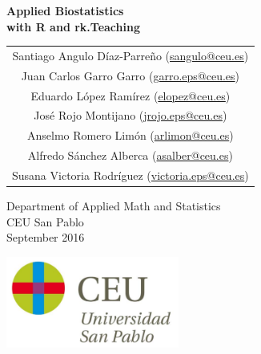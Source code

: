 \begin{titlepage}
\thispagestyle{empty}
\vspace*{7cm}
\par

\begin{center}
\normalfont\fontsize{30}{30}\selectfont
{\bfseries \color{blueceu}Applied Biostatistics\\ with R and rk.Teaching}
\end{center}
\vspace{1cm}

\begin{center}
\Large
\begin{tabular}{c}
Santiago Angulo Díaz-Parreño (\url{sangulo@ceu.es})\\
Juan Carlos Garro Garro (\url{garro.eps@ceu.es})\\
Eduardo López Ramírez (\url{elopez@ceu.es})\\
José Rojo Montijano (\url{jrojo.eps@ceu.es})\\
Anselmo Romero Limón (\url{arlimon@ceu.es})\\
Alfredo Sánchez Alberca (\url{asalber@ceu.es})\\
Susana Victoria Rodríguez (\url{victoria.eps@ceu.es})
\end{tabular}

\medskip 
Department of Applied Math and Statistics\\ CEU San Pablo\\[1cm]
\medskip 
September 2016

\vspace{1cm}
\includegraphics[height=3cm]{img/logo_uspceu}
\end{center}
\vfill
\end{titlepage}
